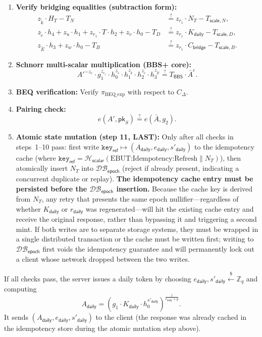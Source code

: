 \documentclass[11pt]{article}
\theoremstyle{definitionstyle}
\theoremstyle{plain}
\newcommand{\DB}{\mathcal{DB}}
\begin{document}
\begin{enumerate}[leftmargin=*]
\item \textbf{Verify bridging equalities (subtraction form):}
  \begin{align*}
    z_{\tilde{k}} \cdot H_T - T_N &\stackrel{?}{=} z_{r_1} \cdot N_T - T_{\mathsf{scale},N}, \\
    z_{\tilde{c}} \cdot h_4 + z_u \cdot h_1 + z_{r_1} \cdot T \cdot h_2 + z_v \cdot h_0 - T_D &\stackrel{?}{=} z_{r_1} \cdot K_{\mathsf{daily}} - T_{\mathsf{scale},D}, \\
    z_{\tilde{E}} \cdot h_3 + z_w \cdot h_0 - T_B &\stackrel{?}{=} z_{r_1} \cdot C_{\mathsf{bridge}} - T_{\mathsf{scale},B}.
  \end{align*}
\item \textbf{Schnorr multi-scalar multiplication (BBS+ core):}
  \[
  A'^{-z_e} \cdot g_1^{z_{r_1}} \cdot h_0^{z_{\tilde{s}}} \cdot h_1^{z_{\tilde{k}}} \cdot h_2^{z_{\tilde{c}}} \cdot h_3^{z_{\tilde{E}}} \stackrel{?}{=} T_{\mathsf{BBS}} \cdot \bar{A}^c.
  \]
\item \textbf{BEQ verification:} Verify $\pi_{\text{BEQ\_exp}}$ with respect to $C_{\Delta}$.
\item \textbf{Pairing check:}
  \[
  e(A', \mathsf{pk}_S) \stackrel{?}{=} e(\bar{A}, g_2).
  \]
\item \textbf{Atomic state mutation (step 11, LAST):} Only after all checks in steps~1--10 pass: first write $\mathtt{key}_{\mathsf{ref}} \mapsto (A_{\mathsf{daily}}, e_{\mathsf{daily}}, s'_{\mathsf{daily}})$ to the idempotency cache (where $\mathtt{key}_{\mathsf{ref}} = \mathcal{H}_{\mathsf{scalar}}(\text{EBUT:Idempotency:Refresh} \parallel N_T)$), then atomically insert $N_T$ into $\DB_{\mathsf{epoch}}$ (reject if already present, indicating a concurrent duplicate or replay). \textbf{The idempotency cache entry must be persisted before the $\DB_{\mathsf{epoch}}$ insertion.} Because the cache key is derived from $N_T$, any retry that presents the same epoch nullifier---regardless of whether $K_{\mathsf{daily}}$ or $r_{\mathsf{daily}}$ was regenerated---will hit the existing cache entry and receive the original response, rather than bypassing it and triggering a second mint.  If both writes are to separate storage systems, they must be wrapped in a single distributed transaction or the cache must be written first; writing to $\DB_{\mathsf{epoch}}$ first voids the idempotency guarantee and will permanently lock out a client whose network dropped between the two writes.
\end{enumerate}

If all checks pass, the server issues a daily token by choosing $e_{\mathsf{daily}}, s'_{\mathsf{daily}} \xleftarrow{\$} \mathbb{Z}_q$ and computing
\[
A_{\mathsf{daily}} = \left( g_1 \cdot K_{\mathsf{daily}} \cdot h_0^{s'_{\mathsf{daily}}} \right)^{\frac{1}{e_{\mathsf{daily}} + y}}.
\]
It sends $(A_{\mathsf{daily}}, e_{\mathsf{daily}}, s'_{\mathsf{daily}})$ to the client (the response was already cached in the idempotency store during the atomic mutation step above).
\end{document}
